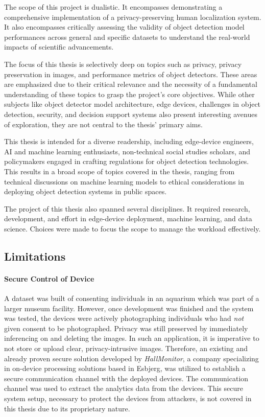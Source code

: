 The scope of this project is dualistic. It encompasses demonstrating a comprehensive implementation of a privacy-preserving human localization system. It also encompasses critically assessing the validity of object detection model performances across general and specific datasets to understand the real-world impacts of scientific advancements. 

The focus of this thesis is selectively deep on topics such as privacy, privacy preservation in images, and performance metrics of object detectors. These areas are emphasized due to their critical relevance and the necessity of a fundamental understanding of these topics to grasp the project's core objectives. While other subjects like object detector model architecture, edge devices, challenges in object detection, security, and decision support systems also present interesting avenues of exploration, they are not central to the thesis' primary aims.

This thesis is intended for a diverse readership, including edge-device engineers, AI and machine learning enthusiasts, non-technical social studies scholars, and policymakers engaged in crafting regulations for object detection technologies. This results in a broad scope of topics covered in the thesis, ranging from technical discussions on machine learning models to ethical considerations in deploying object detection systems in public spaces.

The project of this thesis also spanned several disciplines. It required research, development, and effort in edge-device deployment, machine learning, and data science. Choices were made to focus the scope to manage the workload effectively.

\subsection{Limitations}
\paragraph{Secure Control of Device}
\label{sec:scope_ssh}
A dataset was built of consenting individuals in an aquarium which was part of a larger museum facility. However, once development was finished and the system was tested, the devices were actively photographing individuals who had \textit{not} given consent to be photographed. Privacy was still preserved by immediately inferencing on and deleting the images. In such an application, it is imperative to not store or upload clear, privacy-intrusive images. Therefore, an existing and already proven secure solution developed by \textit{HallMonitor}, a company specializing in on-device processing solutions based in Esbjerg, was utilized to establish a secure communication channel with the deployed devices. The communication channel was used to extract the analytics data from the devices. This secure system setup, necessary to protect the devices from attackers, is not covered in this thesis due to its proprietary nature.

